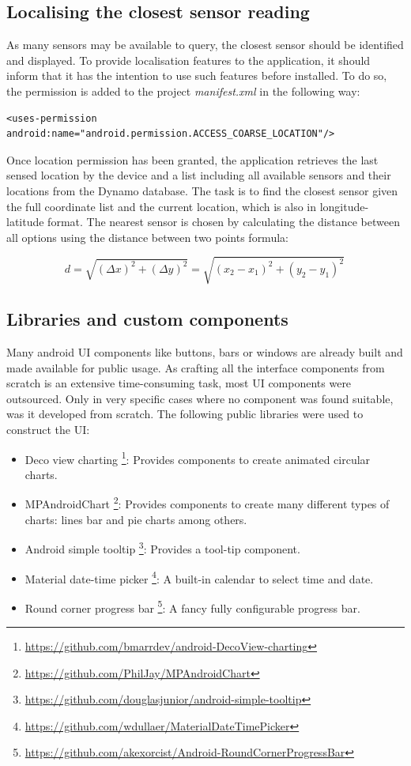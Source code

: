 \subsection{Localising the closest sensor reading}
As many sensors may be available to query, the closest sensor should be identified and displayed. To provide localisation features to the application, it should inform that it has the intention to use such features before installed. To do so, the permission is added to the project \textit{manifest.xml} in the following way: \bigskip

{\centering
\begin{BVerbatim}
<uses-permission android:name="android.permission.ACCESS_COARSE_LOCATION"/>
\end{BVerbatim}
\par
}
\bigskip

Once location permission has been granted, the application retrieves the last sensed location by the device and a list including all available sensors and their locations from the Dynamo database. The task is to find the closest sensor given the full coordinate list and the current location, which is also in longitude-latitude format. The nearest sensor is chosen by calculating the distance between all options using the distance between two points formula: 

\begin{equation}
d={\sqrt {(\Delta x)^{2}+(\Delta y)^{2}}}={\sqrt {(x_{2}-x_{1})^{2}+(y_{2}-y_{1})^{2}}}\,
\end{equation}

\subsection{Libraries and custom components}
Many android UI components like buttons, bars or windows are already built and made available for public usage. As crafting all the interface components from scratch is an extensive time-consuming task, most UI components were outsourced. Only in very specific cases where no component was found suitable, was it developed from scratch. 
The following public libraries were used to construct the UI:
\begin{itemize}
    \item Deco view charting \footnote{\url{https://github.com/bmarrdev/android-DecoView-charting}}: Provides components to create animated circular charts.
    \item MPAndroidChart \footnote{\url{https://github.com/PhilJay/MPAndroidChart}}: Provides components to create many different types of charts: lines bar and pie charts among others.
    \item Android simple tooltip \footnote{\url{https://github.com/douglasjunior/android-simple-tooltip}}: Provides a tool-tip component.
	\item Material date-time picker \footnote{\url{https://github.com/wdullaer/MaterialDateTimePicker}}: A built-in calendar to select time and date.
  \item Round corner progress bar \footnote{\url{https://github.com/akexorcist/Android-RoundCornerProgressBar}}: A fancy fully configurable progress bar.
\end{itemize}

